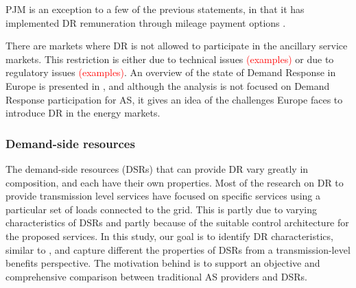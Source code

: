 PJM is an exception to a few of the previous statements, in that it has implemented DR remuneration through mileage payment options \cite{pjm2015energy}.

There are markets where DR is not allowed to participate in the ancillary service markets. This restriction is either due to technical issues \textcolor{red}{(examples)} or due to regulatory issues \textcolor{red}{(examples)}. An overview of the state of Demand Response in Europe is presented in \cite{sedc2014mapping}, and although the analysis is not focused on Demand Response participation for AS, it gives an idea of the challenges Europe faces to introduce DR in the energy markets.
\fi

\subsubsection{Demand-side resources}
The demand-side resources (DSRs) that can provide DR vary greatly in composition, and each have their own properties. Most of the research on DR to provide transmission level services have focused on specific services using a particular set of loads connected to the grid. This is partly due to varying characteristics of DSRs and partly because of the suitable control architecture for the proposed services. In this study, our goal is to identify DR characteristics, similar to \cite{oldewurtel2013framework}, and capture different the properties of DSRs from a transmission-level benefits perspective. The motivation behind is to support an objective and comprehensive comparison between traditional AS providers and DSRs. 

